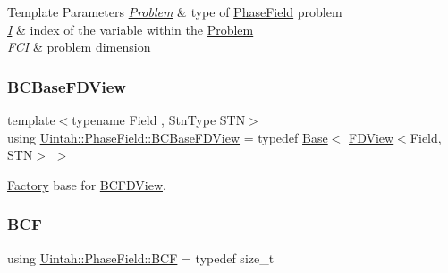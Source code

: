 \begin{DoxyTemplParams}{Template Parameters}
{\em \hyperlink{classUintah_1_1PhaseField_1_1Problem}{Problem}} & type of \hyperlink{namespaceUintah_1_1PhaseField}{Phase\+Field} problem \\
\hline
{\em \hyperlink{structUintah_1_1PhaseField_1_1I}{I}} & index of the variable within the \hyperlink{classUintah_1_1PhaseField_1_1Problem}{Problem} \\
\hline
{\em F\+CI} & problem dimension \\
\hline
\end{DoxyTemplParams}
\mbox{\label{namespaceUintah_1_1PhaseField_a0a0456c1a6ca9d0f48b97e8f4e13e6cc}} 
\subsubsection{\texorpdfstring{B\+C\+Base\+F\+D\+View}{BCBaseFDView}}
{\footnotesize\ttfamily template$<$typename Field , Stn\+Type S\+TN$>$ \\
using \hyperlink{namespaceUintah_1_1PhaseField_a0a0456c1a6ca9d0f48b97e8f4e13e6cc}{Uintah\+::\+Phase\+Field\+::\+B\+C\+Base\+F\+D\+View} = typedef \hyperlink{classUintah_1_1PhaseField_1_1Base}{Base}$<$ \hyperlink{namespaceUintah_1_1PhaseField_a63032464b1cd54eaa53c1c29109746ac}{F\+D\+View}$<$Field, S\+TN$>$ $>$}



\hyperlink{classUintah_1_1PhaseField_1_1Factory}{Factory} base for \hyperlink{classUintah_1_1PhaseField_1_1BCFDView}{B\+C\+F\+D\+View}. 

\mbox{\label{namespaceUintah_1_1PhaseField_ab9b5949afaa59b9b862e606410431331}} 
\subsubsection{\texorpdfstring{B\+CF}{BCF}}
{\footnotesize\ttfamily using \hyperlink{namespaceUintah_1_1PhaseField_ab9b5949afaa59b9b862e606410431331}{Uintah\+::\+Phase\+Field\+::\+B\+CF} = typedef size\+\_\+t}



